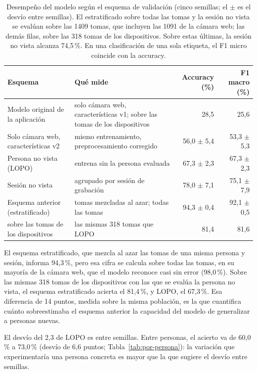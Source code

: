 \begin{table}[h]
    \centering
    \small
    \small
    \begin{tabular}{p{4.6cm}p{5.0cm}rr}
        \toprule
        Esquema & Qué mide & Accuracy (\%) & F1 macro (\%) \\
        \midrule
        Modelo original de la aplicación & solo cámara web, características v1; sobre las tomas de los dispositivos & 28,5 & 25,6 \\
        Solo cámara web, características v2 & mismo entrenamiento, preprocesamiento corregido & 56,0 $\pm$ 5,4 & 53,3 $\pm$ 5,3 \\
        Persona no vista (LOPO) & entrena sin la persona evaluada & 67,3 $\pm$ 2,3 & 67,3 $\pm$ 2,3 \\
        Sesión no vista & agrupado por sesión de grabación & 78,0 $\pm$ 7,1 & 75,1 $\pm$ 7,9 \\
        Esquema anterior (estratificado) & tomas mezcladas al azar; todas las tomas & 94,3 $\pm$ 0,4 & 92,1 $\pm$ 0,5 \\
        \quad sobre las tomas de los dispositivos & las mismas 318 tomas que LOPO & 81,4 & 81,6 \\
        \bottomrule
    \end{tabular}
    \caption{Desempeño del modelo según el esquema de validación (cinco semillas; el $\pm$ es el desvío entre semillas). El estratificado sobre todas las tomas y la sesión no vista se evalúan sobre las 1409 tomas, que incluyen las 1091 de la cámara web; las demás filas, sobre las 318 tomas de los dispositivos. Sobre estas últimas, la sesión no vista alcanza 74,5\,\%. En una clasificación de una sola etiqueta, el F1 micro coincide con la accuracy.}
    \label{tab:escenarios}
\end{table}

El esquema estratificado, que mezcla al azar las tomas de una misma persona y sesión, informa 94,3\,\%, pero esa cifra se calcula sobre todas las tomas, en su mayoría de la cámara web, que el modelo reconoce casi sin error (98,0\,\%). Sobre las mismas 318 tomas de los dispositivos con las que se evalúa la persona no vista, el esquema estratificado acierta el 81,4\,\%, y LOPO, el 67,3\,\%. Esa diferencia de 14 puntos, medida sobre la misma población, es la que cuantifica cuánto sobreestimaba el esquema anterior la capacidad del modelo de generalizar a personas nuevas.

El desvío del 2,3 de LOPO es entre semillas. Entre personas, el acierto va de 60,0\,\% a 73,0\,\% (desvío de 6,6 puntos; Tabla~\ref{tab:por-persona}): la variación que experimentaría una persona concreta es mayor que la que sugiere el desvío entre semillas.

